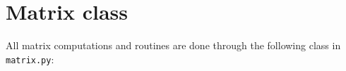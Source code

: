 \section{Matrix class}

All matrix computations and routines are done through the following class in \texttt{matrix.py}:


